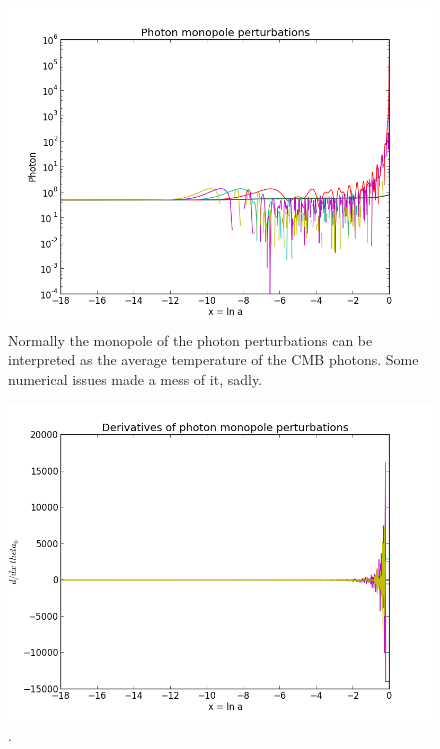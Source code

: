 \documentclass[norsk,a4paper,12pt]{article}
\begin{document}
\begin{figure}[H] 
\begin{center} 
\includegraphics[scale=0.5]{photon.png} 
 

\caption{Normally the monopole of the photon perturbations can be interpreted as the average temperature of the CMB photons. Some numerical issues made a mess of it, sadly. } 
\end{center} 
\end{figure}

\begin{figure}[H] 
\begin{center} 
\includegraphics[scale=0.5]{dphoton.png} 
 

\caption{.} 
\end{center} 
\end{figure}
\end{document}
